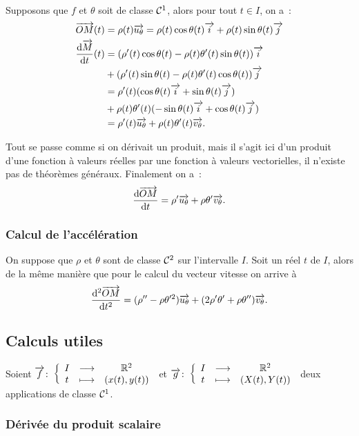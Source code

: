 Supposons que \(f\) et \(\theta\) soit de classe \(\mathcal{C}^{1}\), alors pour tout
\(t \in I\), on a~:
\begin{align}
  \overrightarrow{OM}(t)&=\rho(t) \overrightarrow{u_\theta}=\rho(t)\cos \theta(t) \overrightarrow{i} + \rho(t)\sin
  \theta(t) \overrightarrow{j} \\
  \dfrac{\mathrm{d} \overrightarrow{M}}{\mathrm{d} t}(t)
              &=(\rho'(t) \cos \theta(t) - \rho(t) \theta'(t) \sin \theta(t))
              \overrightarrow{i} \\
              & + (\rho'(t) \sin \theta(t) - \rho(t) \theta'(t) \cos \theta(t))
              \overrightarrow{j} \notag\\
              &=\rho'(t) (\cos \theta(t) \overrightarrow{i} + \sin\theta(t) \overrightarrow{j}) \\
              & + \rho(t)\theta'(t)(-\sin\theta(t)\overrightarrow{i} + \cos\theta(t)\overrightarrow{j})
              \notag\\
              &=\rho'(t)\overrightarrow{u_\theta} + \rho(t)\theta'(t)\overrightarrow{v_\theta}.
\end{align}

Tout se passe comme si on dérivait un produit, mais il s'agit ici d'un produit
d'une fonction à valeurs réelles par une fonction à valeurs vectorielles, il
n'existe pas de théorèmes généraux. Finalement on a~:
\begin{equation}
  \dfrac{\mathrm{d} \overrightarrow{OM}}{\mathrm{d} t} = \rho' \overrightarrow{u_\theta} + \rho \theta' \overrightarrow{v_\theta}.
\end{equation}

\subsubsection{Calcul de l'accélération}

On suppose que \(\rho\) et \(\theta\) sont de classe \(\mathcal{C}^{2}\) sur
l'intervalle \(I\). Soit un réel \(t\) de \(I\), alors de la même manière que
pour le calcul du vecteur vitesse on arrive à
\begin{equation}
  \dfrac{\mathrm{d}^2 \overrightarrow{OM}}{\mathrm{d} {t}^2}=(\rho''-\rho\theta'^2)\overrightarrow{u_\theta} +
  (2\rho'\theta'+\rho\theta'')\overrightarrow{v_\theta}.
\end{equation}

\subsection{Calculs utiles}

Soient \(\overrightarrow{f}\colon\left\{\begin{array}{ccc}I & \longrightarrow &\mathbb{R}^2\\t & \longmapsto & (x(t),y(t))\end{array}\right.\) et
\(\overrightarrow{g}\colon\left\{\begin{array}{ccc}I & \longrightarrow &\mathbb{R}^2\\t & \longmapsto & (X(t),Y(t))\end{array}\right.\) deux applications de classe
\(\mathcal{C}^{1}\).

\subsubsection{Dérivée du produit scalaire}

